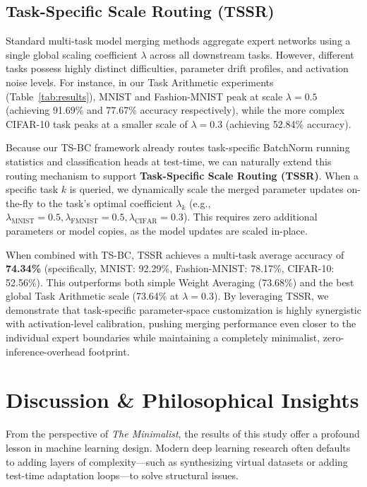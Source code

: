\documentclass{article}
\theoremstyle{plain}
\theoremstyle{definition}
\theoremstyle{remark}
\begin{document}
\subsection{Task-Specific Scale Routing (TSSR)}
Standard multi-task model merging methods aggregate expert networks using a single global scaling coefficient $\lambda$ across all downstream tasks. However, different tasks possess highly distinct difficulties, parameter drift profiles, and activation noise levels. For instance, in our Task Arithmetic experiments (Table~\ref{tab:results}), MNIST and Fashion-MNIST peak at scale $\lambda = 0.5$ (achieving 91.69\% and 77.67\% accuracy respectively), while the more complex CIFAR-10 task peaks at a smaller scale of $\lambda = 0.3$ (achieving 52.84\% accuracy). 

Because our TS-BC framework already routes task-specific BatchNorm running statistics and classification heads at test-time, we can naturally extend this routing mechanism to support \textbf{Task-Specific Scale Routing (TSSR)}. When a specific task $k$ is queried, we dynamically scale the merged parameter updates on-the-fly to the task's optimal coefficient $\lambda_k$ (e.g., $\lambda_{\mathrm{MNIST}} = 0.5, \lambda_{\mathrm{FMNIST}} = 0.5, \lambda_{\mathrm{CIFAR}} = 0.3$). This requires zero additional parameters or model copies, as the model updates are scaled in-place.

When combined with TS-BC, TSSR achieves a multi-task average accuracy of \textbf{74.34\%} (specifically, MNIST: 92.29\%, Fashion-MNIST: 78.17\%, CIFAR-10: 52.56\%). This outperforms both simple Weight Averaging (73.68\%) and the best global Task Arithmetic scale (73.64\% at $\lambda=0.3$). By leveraging TSSR, we demonstrate that task-specific parameter-space customization is highly synergistic with activation-level calibration, pushing merging performance even closer to the individual expert boundaries while maintaining a completely minimalist, zero-inference-overhead footprint.

\section{Discussion \& Philosophical Insights}
From the perspective of \textit{The Minimalist}, the results of this study offer a profound lesson in machine learning design. Modern deep learning research often defaults to adding layers of complexity---such as synthesizing virtual datasets or adding test-time adaptation loops---to solve structural issues. 
\end{document}
